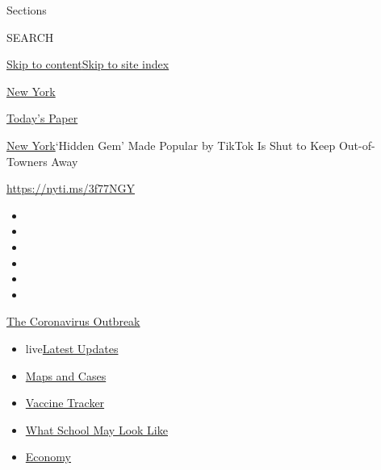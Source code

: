Sections

SEARCH

\protect\hyperlink{site-content}{Skip to
content}\protect\hyperlink{site-index}{Skip to site index}

\href{https://www.nytimes.com/section/nyregion}{New York}

\href{https://myaccount.nytimes.com/auth/login?response_type=cookie\&client_id=vi}{}

\href{https://www.nytimes.com/section/todayspaper}{Today's Paper}

\href{/section/nyregion}{New York}\textbar{}`Hidden Gem' Made Popular by
TikTok Is Shut to Keep Out-of-Towners Away

\url{https://nyti.ms/3f77NGY}

\begin{itemize}
\item
\item
\item
\item
\item
\item
\end{itemize}

\href{https://www.nytimes.com/news-event/coronavirus?action=click\&pgtype=Article\&state=default\&region=TOP_BANNER\&context=storylines_menu}{The
Coronavirus Outbreak}

\begin{itemize}
\tightlist
\item
  live\href{https://www.nytimes.com/2020/08/01/world/coronavirus-covid-19.html?action=click\&pgtype=Article\&state=default\&region=TOP_BANNER\&context=storylines_menu}{Latest
  Updates}
\item
  \href{https://www.nytimes.com/interactive/2020/us/coronavirus-us-cases.html?action=click\&pgtype=Article\&state=default\&region=TOP_BANNER\&context=storylines_menu}{Maps
  and Cases}
\item
  \href{https://www.nytimes.com/interactive/2020/science/coronavirus-vaccine-tracker.html?action=click\&pgtype=Article\&state=default\&region=TOP_BANNER\&context=storylines_menu}{Vaccine
  Tracker}
\item
  \href{https://www.nytimes.com/interactive/2020/07/29/us/schools-reopening-coronavirus.html?action=click\&pgtype=Article\&state=default\&region=TOP_BANNER\&context=storylines_menu}{What
  School May Look Like}
\item
  \href{https://www.nytimes.com/live/2020/07/31/business/stock-market-today-coronavirus?action=click\&pgtype=Article\&state=default\&region=TOP_BANNER\&context=storylines_menu}{Economy}
\end{itemize}

